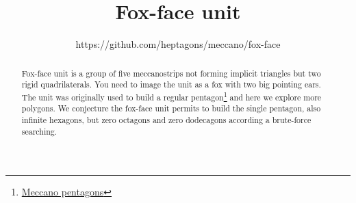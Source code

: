 \documentclass[11pt]{article}
\title{\textbf{Fox-face unit}}
\author{https://github.com/heptagons/meccano/fox-face}
\date{}
\begin{document}
\maketitle
\begin{abstract}
Fox-face unit is a group of five meccano\meccanoref strips not forming implicit triangles
but two rigid quadrilaterals. You need to image the unit as a fox with two big pointing ears.
The unit was originally used to build a regular pentagon\footnote{
\href{https://github.com/heptagons/meccano/tree/main/penta/pentagons.pdf}{Meccano pentagons}	
} and here we explore more polygons.
We conjecture the fox-face unit permits to build the single pentagon, also infinite hexagons,
but zero octagons and zero dodecagons according a brute-force searching.
\end{abstract}
\end{document}
